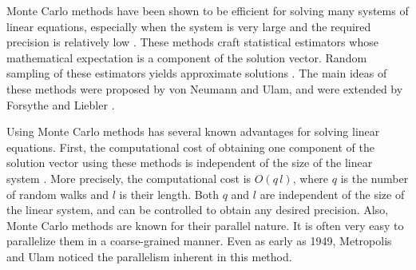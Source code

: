     Monte Carlo methods have been shown to be efficient for
    solving many systems of linear equations, especially when the system is
    very large and the required precision is relatively low
    \cite[]{Tan2002} \cite[]{Dimov1998} \cite[]{Alexandrov1998}.  These methods craft
    statistical estimators whose mathematical expectation is a component
    of the solution vector.  Random sampling of these estimators yields
    approximate solutions \cite[]{Tan2002} \cite[]{Rubinstein1981}
    \cite[]{Westlake1968}.
    The main ideas of these methods were proposed by von Neumann and
    Ulam, and were extended by Forsythe and Liebler \cite[]{Forsythe1950}.
    
    Using Monte Carlo methods has several known advantages for solving
    linear equations.  First, the computational cost of obtaining one
    component of the solution vector using these methods is independent
    of the size of the linear system \cite[]{Tan2002}.  More precisely,
    the computational cost
    is $O(q\,l)$, where $q$ is the number of random walks and $l$ is
    their length.  Both $q$ and $l$ are independent of the size of the
    linear system, and can be controlled to obtain any desired
    precision.  Also, Monte Carlo methods are known for their
    parallel nature.  It is often very easy to parallelize them in a
    coarse-grained manner.  Even as early as 1949, Metropolis and Ulam
    \cite[]{Metropolisand1949} noticed the parallelism inherent in this
    method.
    
